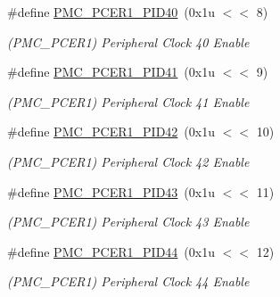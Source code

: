 \begin{DoxyCompactItemize}
\mbox{\label{group__SAME70__PMC_gaffc82d0968fe793572be10036edb19ac}} 
\#define \mbox{\hyperlink{group__SAME70__PMC_gaffc82d0968fe793572be10036edb19ac}{P\+M\+C\+\_\+\+P\+C\+E\+R1\+\_\+\+P\+I\+D40}}~(0x1u $<$$<$ 8)
\begin{DoxyCompactList}\small\item\em (P\+M\+C\+\_\+\+P\+C\+E\+R1) Peripheral Clock 40 Enable \end{DoxyCompactList}\item 
\mbox{\label{group__SAME70__PMC_ga1fc7447315dc95102828c4e6e1dd8019}} 
\#define \mbox{\hyperlink{group__SAME70__PMC_ga1fc7447315dc95102828c4e6e1dd8019}{P\+M\+C\+\_\+\+P\+C\+E\+R1\+\_\+\+P\+I\+D41}}~(0x1u $<$$<$ 9)
\begin{DoxyCompactList}\small\item\em (P\+M\+C\+\_\+\+P\+C\+E\+R1) Peripheral Clock 41 Enable \end{DoxyCompactList}\item 
\mbox{\label{group__SAME70__PMC_ga675b4fb7ad79afa1f77aee029fdf6a8e}} 
\#define \mbox{\hyperlink{group__SAME70__PMC_ga675b4fb7ad79afa1f77aee029fdf6a8e}{P\+M\+C\+\_\+\+P\+C\+E\+R1\+\_\+\+P\+I\+D42}}~(0x1u $<$$<$ 10)
\begin{DoxyCompactList}\small\item\em (P\+M\+C\+\_\+\+P\+C\+E\+R1) Peripheral Clock 42 Enable \end{DoxyCompactList}\item 
\mbox{\label{group__SAME70__PMC_ga31ba26a0baa8670c5e0d577215519597}} 
\#define \mbox{\hyperlink{group__SAME70__PMC_ga31ba26a0baa8670c5e0d577215519597}{P\+M\+C\+\_\+\+P\+C\+E\+R1\+\_\+\+P\+I\+D43}}~(0x1u $<$$<$ 11)
\begin{DoxyCompactList}\small\item\em (P\+M\+C\+\_\+\+P\+C\+E\+R1) Peripheral Clock 43 Enable \end{DoxyCompactList}\item 
\mbox{\label{group__SAME70__PMC_ga3a00699253fb906fe0afed7b8521b7fa}} 
\#define \mbox{\hyperlink{group__SAME70__PMC_ga3a00699253fb906fe0afed7b8521b7fa}{P\+M\+C\+\_\+\+P\+C\+E\+R1\+\_\+\+P\+I\+D44}}~(0x1u $<$$<$ 12)
\begin{DoxyCompactList}\small\item\em (P\+M\+C\+\_\+\+P\+C\+E\+R1) Peripheral Clock 44 Enable \end{DoxyCompactList}\item 
$$
\end{DoxyCompactItemize}
